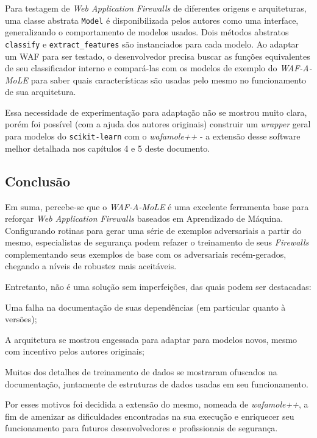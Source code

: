 \bigskip

Para testagem de \textit{Web Application Firewalls} de diferentes origens e arquiteturas, uma classe abstrata \verb+Model+ é disponibilizada pelos autores como uma interface, generalizando o comportamento de modelos usados. Dois métodos abstratos \verb+classify+ e \verb+extract_features+ são instanciados para cada modelo. Ao adaptar um WAF para ser testado, o desenvolvedor precisa buscar as funções equivalentes de seu classificador interno e compará-las com os modelos de exemplo do \textit{WAF-A-MoLE} para saber quais características são usadas pelo mesmo no funcionamento de sua arquitetura.

Essa necessidade de experimentação para adaptação não se mostrou muito clara, porém foi possível (com a ajuda dos autores originais) construir um \textit{wrapper} geral para modelos do \verb+scikit-learn+ com o \textit{wafamole++} - a extensão desse software melhor detalhada nos capítulos 4 e 5 deste documento.

\subsection{Conclusão}
Em suma, percebe-se que o \textit{WAF-A-MoLE} é uma excelente ferramenta base para reforçar \textit{Web Application Firewalls} baseados em Aprendizado de Máquina. Configurando rotinas para gerar uma série de exemplos adversariais a partir do mesmo, especialistas de segurança podem refazer o treinamento de seus \textit{Firewalls} complementando seus exemplos de base com os adversariais recém-gerados, chegando a níveis de robustez mais aceitáveis. 

Entretanto, não é uma solução sem imperfeições, das quais podem ser destacadas:
\begin{alineas}
\item Uma falha na documentação de suas dependências (em particular quanto à versões);
\item A arquitetura se mostrou engessada para adaptar para modelos novos, mesmo com incentivo pelos autores originais;
\item Muitos dos detalhes de treinamento de dados se mostraram ofuscados na documentação, juntamente de estruturas de dados usadas em seu funcionamento.
\end{alineas}

Por esses motivos foi decidida a extensão do mesmo, nomeada de \textit{wafamole++}, a fim de amenizar as dificuldades encontradas na sua execução e enriquecer seu funcionamento para futuros desenvolvedores e profissionais de segurança.


